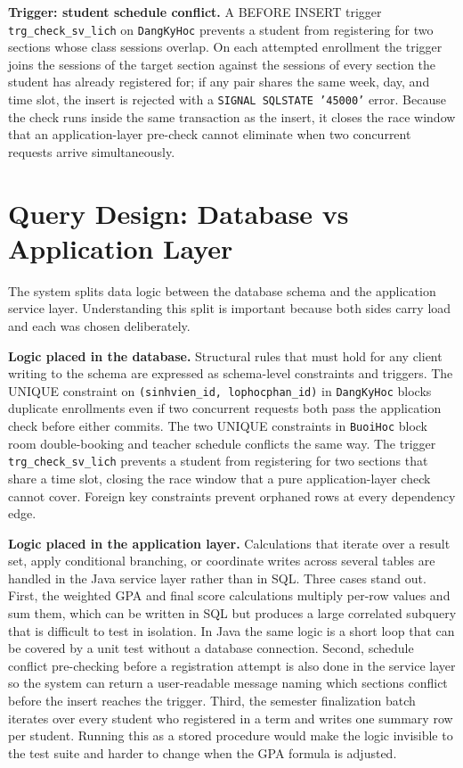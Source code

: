 \documentclass[12pt,a4paper]{report}
\begin{document}
\textbf{Trigger: student schedule conflict.} A BEFORE INSERT trigger \texttt{trg\_check\_sv\_lich} on \texttt{DangKyHoc} prevents a student from registering for two sections whose class sessions overlap. On each attempted enrollment the trigger joins the sessions of the target section against the sessions of every section the student has already registered for; if any pair shares the same week, day, and time slot, the insert is rejected with a \texttt{SIGNAL SQLSTATE '45000'} error. Because the check runs inside the same transaction as the insert, it closes the race window that an application-layer pre-check cannot eliminate when two concurrent requests arrive simultaneously.

\section{Query Design: Database vs Application Layer}

The system splits data logic between the database schema and the application service layer. Understanding this split is important because both sides carry load and each was chosen deliberately.

\textbf{Logic placed in the database.} Structural rules that must hold for any client writing to the schema are expressed as schema-level constraints and triggers. The UNIQUE constraint on \texttt{(sinhvien\_id, lophocphan\_id)} in \texttt{DangKyHoc} blocks duplicate enrollments even if two concurrent requests both pass the application check before either commits. The two UNIQUE constraints in \texttt{BuoiHoc} block room double-booking and teacher schedule conflicts the same way. The trigger \texttt{trg\_check\_sv\_lich} prevents a student from registering for two sections that share a time slot, closing the race window that a pure application-layer check cannot cover. Foreign key constraints prevent orphaned rows at every dependency edge.

\textbf{Logic placed in the application layer.} Calculations that iterate over a result set, apply conditional branching, or coordinate writes across several tables are handled in the Java service layer rather than in SQL. Three cases stand out. First, the weighted GPA and final score calculations multiply per-row values and sum them, which can be written in SQL but produces a large correlated subquery that is difficult to test in isolation. In Java the same logic is a short loop that can be covered by a unit test without a database connection. Second, schedule conflict pre-checking before a registration attempt is also done in the service layer so the system can return a user-readable message naming which sections conflict before the insert reaches the trigger. Third, the semester finalization batch iterates over every student who registered in a term and writes one summary row per student. Running this as a stored procedure would make the logic invisible to the test suite and harder to change when the GPA formula is adjusted.
\end{document}

